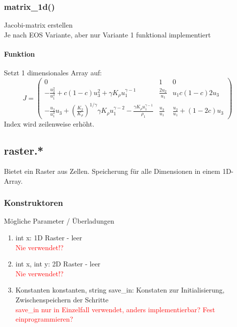 \documentclass[12pt]{article}
\begin{document}
\subsubsection{matrix\_1d()} \label{sssec:mat1d}
Jacobi-matrix erstellen\\
Je nach EOS Variante, aber nur Variante 1 funktional implementiert

\paragraph{Funktion}
Setzt 1 dimensionales Array auf:
\begin{equation}
J = \left(\begin{array}{ccc}
0 & 1 & 0\\[3mm]
- \frac{u_2^2}{u_1^2} + c (1-c) u_3^2  + \gamma K_\rho u_1^{\gamma-1}
& \frac{2 u_2}{u_1}  &  u_1 c (1-c) 2 u_3  \\[3mm]
- \frac{u_2}{u_1^2} u_3 +
\left(\frac{K_2}{K_\rho}\right)^{1/\gamma}
\gamma K_\rho u_1^{\gamma-2} - \frac{\gamma K_\rho u_1^{\gamma-1}}{\rho_1} 
&   \frac{u_3}{u_1}  &  
\frac{u_2}{u_1} + (1-2c) u_3 
\end{array}\right)\label{eq:jacobi_v1}
\end{equation}
Index wird zeilenweise erhöht.

\subsection{raster.*}
Bietet ein Raster aus Zellen. Speicherung für alle Dimensionen in einem 1D-Array.

\subsubsection{Konstruktoren}
Mögliche Parameter / Überladungen
\renewcommand{\labelenumi}{\alph{enumi})} 
\begin{enumerate}
	\item int x: 1D Raster - leer\\
	\textcolor{red}{Nie verwendet!?}
	\item int x, int y: 2D Raster - leer\\
	\textcolor{red}{Nie verwendet!?}
	\item Konstanten konstanten, string save\_in: Konstaten zur Initialisierung, Zwischenspeichern der Schritte\\
	\textcolor{red}{save\_in nur in Einzelfall verwendet, anders implementierbar? Fest einprogrammieren?}
\end{enumerate}
\end{document}
